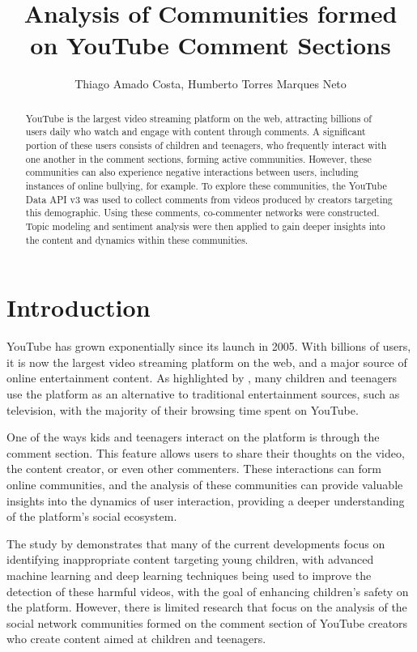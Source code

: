 \documentclass[12pt]{article}
\title{Analysis of Communities formed on YouTube Comment Sections}
\author{Thiago Amado Costa\inst{1}, Humberto Torres Marques Neto\inst{1}}
\begin{document}
\maketitle

\begin{abstract}
    YouTube is the largest video streaming platform on the web, attracting billions of users 
    daily who watch and engage with content through comments. 
    A significant portion of these users consists of children and teenagers, who frequently interact 
    with one another in the comment sections, forming active communities. 
    However, these communities can also experience negative interactions between users, 
    including instances of online bullying, for example.
    To explore these communities, the YouTube Data API v3 was used to collect comments 
    from videos produced by creators targeting this demographic. Using these comments, co-commenter
    networks were constructed.
    Topic modeling and sentiment analysis were then applied to gain deeper insights into the  
    content and dynamics within these communities.
\end{abstract}

\section{Introduction}


YouTube has grown exponentially since its launch in 2005. With billions of users, it is now the 
largest video streaming platform on the web, and a major source of online entertainment content. 
As highlighted by \cite{app13064044}, many children and teenagers use the platform as an alternative to 
traditional entertainment sources, such as television, with the majority of their 
browsing time spent on YouTube. 

One of the ways kids and teenagers interact on the platform is through 
the comment section. This feature allows users to share their thoughts on the video, the content creator, 
or even other commenters. These interactions can form online communities, and the analysis of these
communities can provide valuable insights into the dynamics of user interaction, providing a deeper 
understanding of the platform's social ecosystem.

The study by \cite{app13064044} demonstrates that many of the current developments focus on identifying
inappropriate content targeting young children, with advanced machine learning and deep learning 
techniques being used to improve the detection of these harmful videos, with the goal of enhancing 
children's safety on the platform. However, there is limited research that focus on the analysis of 
the social network communities formed on the comment section of YouTube creators who 
create content aimed at children and teenagers.
\end{document}
